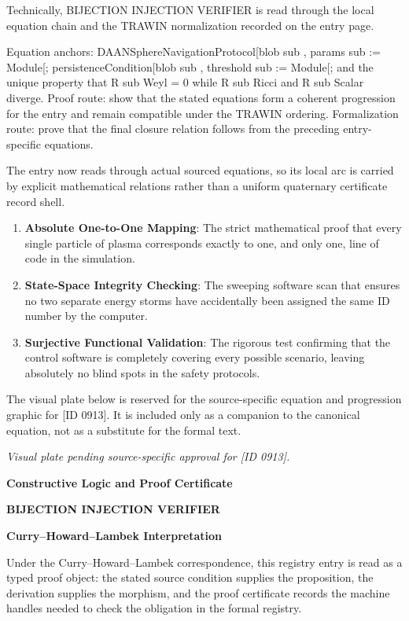 Technically, BIJECTION INJECTION VERIFIER is read through the local equation chain and the TRAWIN normalization recorded on the entry page.

Equation anchors: DAANSphereNavigationProtocol[blob sub , params sub := Module[; persistenceCondition[blob sub , threshold sub := Module[; and the unique property that R sub Weyl = 0 while R sub Ricci and R sub Scalar diverge. Proof route: show that the stated equations form a coherent progression for the entry and remain compatible under the TRAWIN ordering. Formalization route: prove that the final closure relation follows from the preceding entry-specific equations.

The entry now reads through actual sourced equations, so its local arc is carried by explicit mathematical relations rather than a uniform quaternary certificate record shell.
\endgroup

\begin{enumerate}[leftmargin=1.6em,itemsep=6pt,topsep=4pt]
\item \textbf{Absolute One-to-One Mapping}: The strict mathematical proof that every single particle of plasma corresponds exactly to one, and only one, line of code in the simulation.
\item \textbf{State-Space Integrity Checking}: The sweeping software scan that ensures no two separate energy storms have accidentally been assigned the same ID number by the computer.
\item \textbf{Surjective Functional Validation}: The rigorous test confirming that the control software is completely covering every possible scenario, leaving absolutely no blind spots in the safety protocols.
\end{enumerate}

\begingroup\footnotesize\sloppy
The visual plate below is reserved for the source-specific equation and progression graphic for [ID 0913]. It is included only as a companion to the canonical equation, not as a substitute for the formal text.
\par\endgroup
\begingroup\footnotesize\itshape
Visual plate pending source-specific approval for [ID 0913].
\par\endgroup

\clearpage
\begingroup\tzpsupportsetup
\noindent\textbf{\fontsize{10.8pt}{12.8pt}\selectfont [ID 0913] Constructive Logic and Proof Certificate}\par
\noindent\textbf{\fontsize{10pt}{12pt}\selectfont BIJECTION INJECTION VERIFIER}\par
\vspace{0.45em}
\begingroup
\footnotesize
\setlength{\parskip}{0.22em}
\setlength{\parindent}{0pt}
\noindent\textbf{Curry--Howard--Lambek Interpretation}\par
Under the Curry--Howard--Lambek correspondence, this registry entry is read as a typed proof
object: the stated source condition supplies the proposition, the derivation supplies the
morphism, and the proof certificate records the machine handles needed to check the obligation
in the formal registry.

